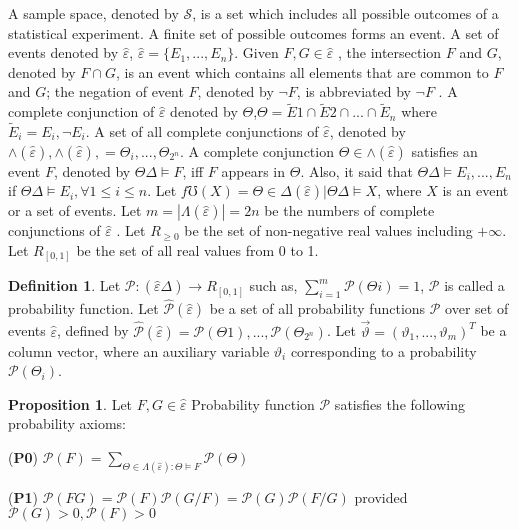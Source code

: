 \documentclass[]{iosart2c}
\begin{document}
A sample space, denoted by $\mathcal S$, is a set which includes all possible outcomes of a statistical experiment. A finite set of possible outcomes forms an event. A set of events denoted by $\hat{\varepsilon}$, $\hat{\varepsilon} = \{ E _1, ... , E_n \}$. Given $F,G \in \hat{\varepsilon}$ , the intersection $F$ and $G$, denoted by $F \cap G$, is an event which contains all elements that are common to $F$ and $G$; the negation of event $F$, denoted by $\neg F$, is abbreviated by $\neg F$ . A complete conjunction of $\hat{\varepsilon}$ denoted by $\Theta$,$\Theta = \tilde E1 \cap \tilde E2 \cap ... \cap \tilde E_n$ where $\tilde E_i = {E_i, \neg E_i}$. A set of all complete conjunctions of $\hat{\varepsilon}$, denoted by $\wedge (\hat{\varepsilon}),\wedge (\hat{\varepsilon}),= {\Theta_i, ... , \Theta_{2^n}  }$. A complete conjunction $\Theta \in \wedge (\hat{\varepsilon} )$ satisfies an event $F$, denoted by $\Theta \Delta \models F$, iff  $F$ appears in $\Theta$. Also, it said that $\Theta \Delta \models {E_i, ... , E_n}$ if $\Theta \Delta \models E_i, \forall 1 \le i \le n$. Let $f\mho (X) = {\Theta \in \Delta (\hat{\varepsilon} )|\Theta \Delta \models X}$, where $X$ is an event or a set of events. Let $m = |\Lambda(\hat{\varepsilon})| = 2n$ be the numbers of complete conjunctions of $\hat{\varepsilon}$ . Let $R_{\geq0}$ be the set of non-negative real values including $+\infty$. Let $R_{[0,1]}$ be the set of all real values from 0 to 1.

\textbf{Definition 1}. Let $\mathcal{P} : (\hat{\varepsilon} \Delta ) \to R_{[0,1]}$ such as, 
$\sum_{i=1}^m \mathcal{P} (\Theta i) = 1$, $\mathcal{P}$ is called a probability function.
Let $\hat{\mathcal{P}} (\hat  \varepsilon )$ be a set of all probability functions $\mathcal{P}$ over set of events $\hat  \varepsilon$, defined by $\hat{\mathcal{P}}(\hat  \varepsilon) =  {\mathcal{P} (\Theta1), ... ,\mathcal{P} (\Theta_{2^n} )}$. Let $\vec{\vartheta} = (\vartheta_1, ... , \vartheta_m)^T$ be a column vector, where an auxiliary variable $\vartheta_i$ corresponding to a probability $\mathcal{P}(\Theta_i)$.

\textbf{Proposition 1}. Let $F,G \in \hat{\varepsilon}$ Probability function $\mathcal{P}$ satisfies the following probability axioms:

(\textbf{P0}) $\mathcal{P}(F) = \sum_{\Theta  \in  \Lambda (\hat{\varepsilon}):\Theta  \models F}\mathcal{P}(\Theta)$

(\textbf{P1}) $\mathcal{P} (FG) = \mathcal{P} (F) \mathcal{P} (G/F) = \mathcal{P} (G) \mathcal{P} (F/G)$ provided $\mathcal{P} (G) > 0,\mathcal{P} (F) > 0$
\end{document}
